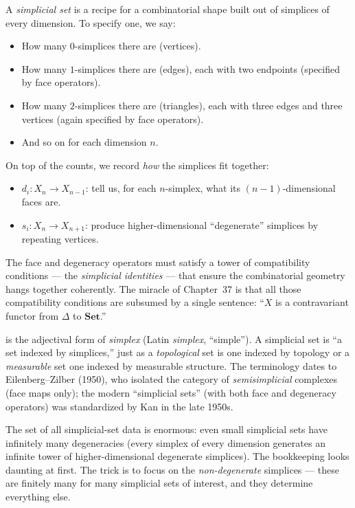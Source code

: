 A \emph{simplicial set} is a recipe for a combinatorial shape built out
of simplices of every dimension. To specify one, we say:
\begin{itemize}
  \item How many $0$-simplices there are (vertices).
  \item How many $1$-simplices there are (edges), each with two endpoints
        (specified by face operators).
  \item How many $2$-simplices there are (triangles), each with three
        edges and three vertices (again specified by face operators).
  \item And so on for each dimension $n$.
\end{itemize}

On top of the counts, we record \emph{how} the simplices fit together:
\begin{itemize}
  \item {} $d_i : X_n \to X_{n-1}$: tell us, for each
        $n$-simplex, what its $(n-1)$-dimensional faces are.
  \item {} $s_i : X_n \to X_{n+1}$: produce
        higher-dimensional ``degenerate'' simplices by repeating
        vertices.
\end{itemize}

The face and degeneracy operators must satisfy a tower of compatibility
conditions — the \emph{simplicial identities} — that ensure the
combinatorial geometry hangs together coherently. The miracle of
Chapter~37 is that all those compatibility conditions are subsumed by a
single sentence: ``$X$ is a contravariant functor from $\Delta$ to
$\mathbf{Set}$.''

\begin{nameorigin}
 is the adjectival form of \emph{simplex} (Latin
\emph{simplex}, ``simple''). A simplicial set is ``a set indexed by
simplices,'' just as a \emph{topological} set is one indexed by topology
or a \emph{measurable} set one indexed by measurable structure. The
terminology dates to Eilenberg–Zilber (1950), who isolated the category
of \emph{semisimplicial} complexes (face maps only); the modern
``simplicial sets'' (with both face and degeneracy operators) was
standardized by Kan in the late 1950s.
\end{nameorigin}

\begin{readernote}
The set of all simplicial-set data is enormous: even small simplicial
sets have infinitely many degeneracies (every simplex of every dimension
generates an infinite tower of higher-dimensional degenerate simplices).
The bookkeeping looks daunting at first. The trick is to focus on the
\emph{non-degenerate} simplices — these are finitely many for many
simplicial sets of interest, and they determine everything else.
\end{readernote}

